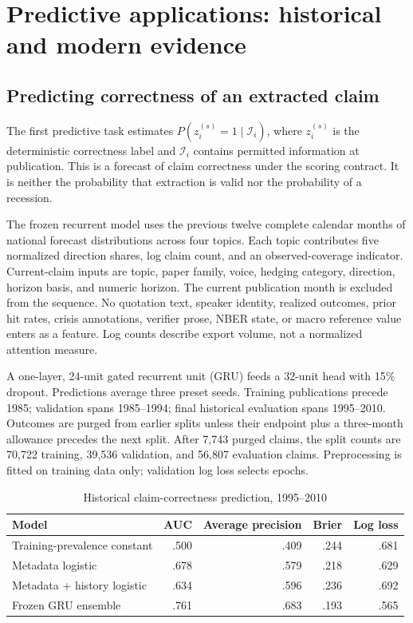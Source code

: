 \section{Predictive applications: historical and modern evidence}
\subsection{Predicting correctness of an extracted claim}
The first predictive task estimates $P(z_i^{(s)}=1\mid\mathcal I_i)$, where $z_i^{(s)}$ is the deterministic correctness label and $\mathcal I_i$ contains permitted information at publication. This is a forecast of claim correctness under the scoring contract. It is neither the probability that extraction is valid nor the probability of a recession.

The frozen recurrent model uses the previous twelve complete calendar months of national forecast distributions across four topics. Each topic contributes five normalized direction shares, log claim count, and an observed-coverage indicator. Current-claim inputs are topic, paper family, voice, hedging category, direction, horizon basis, and numeric horizon. The current publication month is excluded from the sequence. No quotation text, speaker identity, realized outcomes, prior hit rates, crisis annotations, verifier prose, NBER state, or macro reference value enters as a feature. Log counts describe export volume, not a normalized attention measure.

A one-layer, 24-unit gated recurrent unit (GRU) feeds a 32-unit head with 15\% dropout. Predictions average three preset seeds. Training publications precede 1985; validation spans 1985--1994; final historical evaluation spans 1995--2010. Outcomes are purged from earlier splits unless their endpoint plus a three-month allowance precedes the next split. After 7,743 purged claims, the split counts are 70,722 training, 39,536 validation, and 56,807 evaluation claims. Preprocessing is fitted on training data only; validation log loss selects epochs.

\begin{table}[t]
\caption{Historical claim-correctness prediction, 1995--2010}\label{tab:rnn}
\centering\small
\begin{tabularx}{\linewidth}{Xrrrr}
\toprule
Model & AUC & Average precision & Brier & Log loss\\
\midrule
Training-prevalence constant & .500 & .409 & .244 & .681\\
Metadata logistic & .678 & .579 & .218 & .629\\
Metadata + history logistic & .634 & .596 & .236 & .692\\
Frozen GRU ensemble & .761 & .683 & .193 & .565\\
\bottomrule
\end{tabularx}
\end{table}

